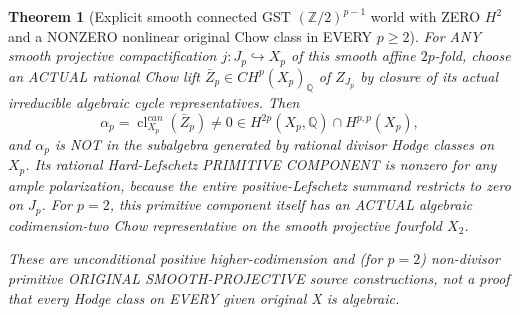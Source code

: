 \documentclass[11pt]{article}
\newtheorem{theorem}{Theorem}
\begin{document}
\begin{theorem}[Explicit smooth connected GST $(\mathbb Z/2)^{p-1}$ world with ZERO $H^2$ and a NONZERO nonlinear original Chow class in EVERY $p\ge2$]
For ANY smooth projective compactification
$j:J_p\hookrightarrow X_p$
of this smooth affine $2p$-fold,
choose an ACTUAL rational Chow lift
$\bar Z_p\in CH^p(X_p)_{\mathbb Q}$
of $Z_{J_p}$ by closure of its
actual irreducible algebraic cycle
representatives. Then
\[
 \boxed{
  \alpha_p=\operatorname{cl}_{X_p}^{can}
        (\bar Z_p)
  \ne0\in H^{2p}(X_p,\mathbb Q)
          \cap H^{p,p}(X_p),
 }                                                    \tag{26}
\]
and $\alpha_p$ is NOT in the subalgebra
generated by rational divisor Hodge
classes on $X_p$. Its rational
Hard-Lefschetz PRIMITIVE COMPONENT
is nonzero for any ample polarization,
because the entire positive-Lefschetz
summand restricts to zero on $J_p$.
For $p=2$, this primitive component
itself has an ACTUAL algebraic
codimension-two Chow representative
on the smooth projective fourfold $X_2$.

These are unconditional positive
higher-codimension and (for $p=2$)
non-divisor primitive ORIGINAL
SMOOTH-PROJECTIVE source constructions,
not a proof that every Hodge class
on EVERY given original X is algebraic.
\end{theorem}
\end{document}
